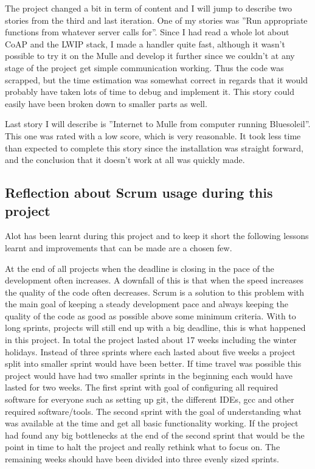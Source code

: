The project changed a bit in term of content and I will jump to describe two stories from the third and last iteration.
One of my stories was ''Run appropriate functions from whatever server calls for''. Since I had read a whole lot about CoAP and 
the LWIP stack, I made a handler quite fast, although it wasn't possible to try it on the Mulle and develop it further since
we couldn't at any stage of the project get simple communication working. Thus the code was scrapped, but the time estimation was somewhat
correct in regards that it would probably have taken lots of time to debug and implement it. 
This story could easily have been broken down to smaller parts as well.

Last story I will describe is ''Internet to Mulle from computer running Bluesoleil''. This one was rated with a low score, which is 
very reasonable. It took less time than expected to complete this story since the installation was straight forward, and the conclusion
that it doesn't work at all was quickly made.

\subsection{Reflection about Scrum usage during this project}
Alot has been learnt during this project and to keep it short the following lessons learnt and improvements that can be made are a chosen few.

At the end of all projects when the deadline is closing in the pace of the development often increases.
A downfall of this is that when the speed increases the quality of the code often decreases.
Scrum is a solution to this problem with the main goal of keeping a steady development pace and always keeping the quality of the code as good as possible above some minimum criteria.
With to long sprints, projects will still end up with a big deadline, this is what happened in this project.
In total the project lasted about 17 weeks including the winter holidays.
Instead of three sprints where each lasted about five weeks a project split into smaller sprint would have been better.
If time travel was possible this project would have had two smaller sprints in the beginning each would have lasted for two weeks.
The first sprint with goal of configuring all required software for everyone such as setting up git, the different IDEs, gcc and other required software/tools.
The second sprint with the goal of understanding what was available at the time and get all basic functionality working.
If the project had found any big bottlenecks at the end of the second sprint that would be the point in time to halt the project and really rethink what to focus on.
The remaining weeks should have been divided into three evenly sized sprints.

